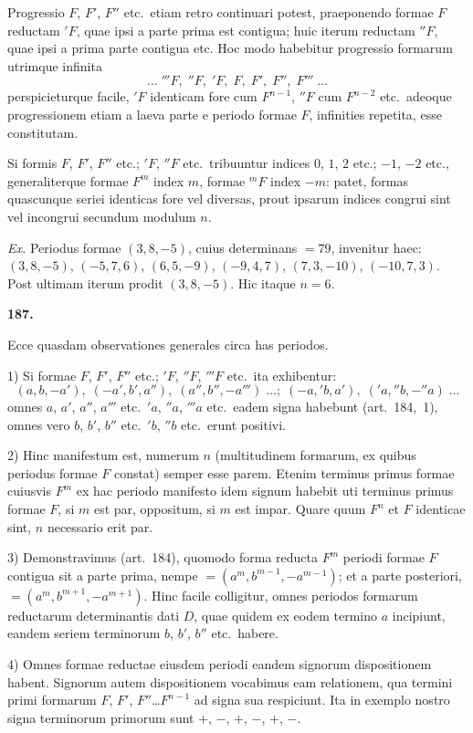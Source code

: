 \documentclass[12pt,a4paper]{article}
\theoremstyle{plain}
\begin{document}
Progressio $F$, $F'$, $F''$ etc.~etiam retro continuari potest, praeponendo formae $F$ reductam $'F$, quae ipsi a parte prima est contigua; huic iterum reductam $''F$, quae ipsi a prima parte contigua etc. Hoc modo habebitur progressio formarum utrimque infinita
\[
\ldots \; '''F, \; ''F, \; 'F, \; F, \; F', \; F'', \; F''' \; \ldots
\]
perspicieturque facile, $'F$ identicam fore cum $F^{n-1}$, $''F$ cum $F^{n-2}$ etc.~adeoque progressionem etiam a laeva parte e periodo formae $F$, infinities repetita, esse constitutam.

Si formis $F$, $F'$, $F''$ etc.; $'F$, $''F$ etc.~tribuuntur indices $0$, $1$, $2$ etc.; $-1$, $-2$ etc., generaliterque formae $F^m$ index $m$, formae $^mF$ index $-m$: patet, formas quascunque seriei identicas fore vel diversas, prout ipsarum indices congrui sint vel incongrui secundum modulum $n$.

\textit{Ex.} Periodus formae $(3, 8, -5)$, cuius determinans $= 79$, invenitur haec: $(3, 8, -5)$, $(-5, 7, 6)$, $(6, 5, -9)$, $(-9, 4, 7)$, $(7, 3, -10)$, $(-10, 7, 3)$. Post ultimam iterum prodit $(3, 8, -5)$. Hic itaque $n = 6$.

\bigskip

\textbf{187.}

Ecce quasdam observationes generales circa has periodos.

1) Si formae $F$, $F'$, $F''$ etc.; $'F$, $''F$, $'''F$ etc.~ita exhibentur:
\[
(a, b, -a'), \; (-a', b', a''), \; (a'', b'', -a''') \; \ldots; \; (-a, 'b, a'), \; ('a, ''b, -''a) \; \ldots
\]
omnes $a$, $a'$, $a''$, $a'''$ etc.~$'a$, $''a$, $'''a$ etc.~eadem signa habebunt (art.~184,~1), omnes vero $b$, $b'$, $b''$ etc.~$'b$, $''b$ etc.~erunt positivi.

2) Hinc manifestum est, numerum $n$ (multitudinem formarum, ex quibus periodus formae $F$ constat) semper esse parem. Etenim terminus primus formae cuiusvis $F^m$ ex hac periodo manifesto idem signum habebit uti terminus primus formae $F$, si $m$ est par, oppositum, si $m$ est impar. Quare quum $F^n$ et $F$ identicae sint, $n$ necessario erit par.

3) Demonstravimus (art.~184), quomodo forma reducta $F^m$ periodi formae $F$ contigua sit a parte prima, nempe $= (a^m, b^{m-1}, -a^{m-1})$; et a parte posteriori, $= (a^m, b^{m+1}, -a^{m+1})$. Hinc facile colligitur, omnes periodos formarum reductarum determinantis dati $D$, quae quidem ex eodem termino $a$ incipiunt, eandem seriem terminorum $b$, $b'$, $b''$ etc.~habere.

4) Omnes formae reductae eiusdem periodi eandem signorum dispositionem habent. Signorum autem dispositionem vocabimus eam relationem, qua termini primi formarum $F$, $F'$, $F''$\ldots$F^{n-1}$ ad signa sua respiciunt. Ita in exemplo nostro signa terminorum primorum sunt $+$, $-$, $+$, $-$, $+$, $-$.
\end{document}
